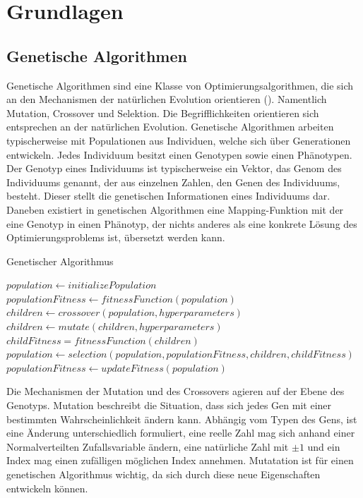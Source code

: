 \section{Grundlagen}
\label{sub:grundlagen}
\subsection{Genetische Algorithmen}

Genetische Algorithmen sind eine Klasse von Optimierungsalgorithmen, die sich an den Mechanismen der natürlichen Evolution orientieren (\cite{Simon.2013}).
Namentlich Mutation, Crossover und Selektion.
Die Begrifflichkeiten orientieren sich entsprechen an der natürlichen Evolution.
Genetische Algorithmen arbeiten typischerweise mit Populationen aus Individuen, welche sich über Generationen entwickeln.
Jedes Individuum besitzt einen Genotypen sowie einen Phänotypen.
Der Genotyp eines Individuums ist typischerweise ein Vektor, das Genom des Individuums genannt, der aus einzelnen Zahlen, den Genen des Individuums, besteht. Dieser stellt die genetischen Informationen eines Individuums dar. Daneben existiert in genetischen Algorithmen eine Mapping-Funktion mit der eine Genotyp in einen Phänotyp, der nichts anderes als eine konkrete Lösung des Optimierungsproblems ist, übersetzt werden kann.

\begin{algorithm}
\caption{Genetischer Algorithmus} \label{alg:geneticAlgorihtm}
\begin{algorithmic}[1]
	\State $population \gets initializePopulation$
	\State $populationFitness \gets fitnessFunction(population)$
		\State $children \gets crossover(population,hyperparameters)$
		\State $children \gets mutate(children,hyperparameters)$
		\State $childFitness = fitnessFunction(children)$
		\State $population \gets selection(population,populationFitness,children,childFitness)$
		\State $populationFitness \gets updateFitness(population)$
	\EndFor
	\EndProcedure
\end{algorithmic}
\end{algorithm}

Die Mechanismen der Mutation und des Crossovers agieren auf der Ebene des Genotyps.
Mutation beschreibt die Situation, dass sich jedes Gen mit einer bestimmten Wahrscheinlichkeit ändern kann. 
Abhängig vom Typen des Gens, ist eine Änderung unterschiedlich formuliert, eine reelle Zahl mag sich anhand einer Normalverteilten Zufallsvariable ändern, eine natürliche Zahl mit $\pm1$ und ein Index mag einen zufälligen möglichen Index annehmen. 
Mutatation ist für einen genetischen Algorithmus wichtig, da sich durch diese neue Eigenschaften entwickeln können.

